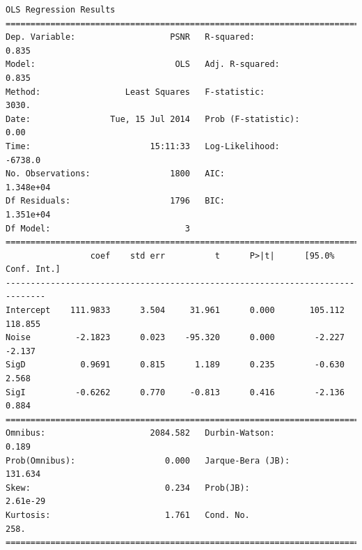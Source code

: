 \documentclass[11pt]{article}
\theoremstyle{definition}
\begin{document}
{\begin{lstlisting}[caption = Time Series 2 - Bilateral Filter 2 Same Iterations OLS Model, label = {2samebilateral2}]
                            OLS Regression Results                            
==============================================================================
Dep. Variable:                   PSNR   R-squared:                       0.835
Model:                            OLS   Adj. R-squared:                  0.835
Method:                 Least Squares   F-statistic:                     3030.
Date:                Tue, 15 Jul 2014   Prob (F-statistic):               0.00
Time:                        15:11:33   Log-Likelihood:                -6738.0
No. Observations:                1800   AIC:                         1.348e+04
Df Residuals:                    1796   BIC:                         1.351e+04
Df Model:                           3                                         
==============================================================================
                 coef    std err          t      P>|t|      [95.0% Conf. Int.]
------------------------------------------------------------------------------
Intercept    111.9833      3.504     31.961      0.000       105.112   118.855
Noise         -2.1823      0.023    -95.320      0.000        -2.227    -2.137
SigD           0.9691      0.815      1.189      0.235        -0.630     2.568
SigI          -0.6262      0.770     -0.813      0.416        -2.136     0.884
==============================================================================
Omnibus:                     2084.582   Durbin-Watson:                   0.189
Prob(Omnibus):                  0.000   Jarque-Bera (JB):              131.634
Skew:                           0.234   Prob(JB):                     2.61e-29
Kurtosis:                       1.761   Cond. No.                         258.
==============================================================================
\end{lstlisting}

}
\end{document}
